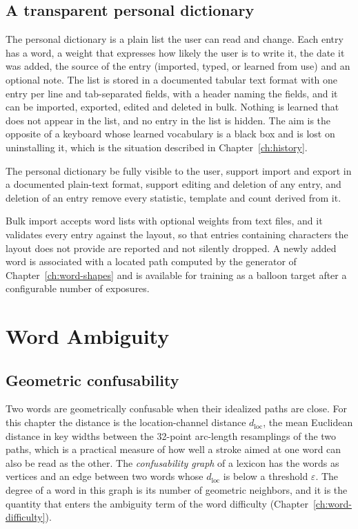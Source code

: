 \section{A transparent personal dictionary}

The personal dictionary is a plain list the user can read and change. Each entry has a word, a weight that expresses how likely the user is to write it, the date it was added, the source of the entry (imported, typed, or learned from use) and an optional note. The list is stored in a documented tabular text format with one entry per line and tab-separated fields, with a header naming the fields, and it can be imported, exported, edited and deleted in bulk. Nothing is learned that does not appear in the list, and no entry in the list is hidden. The aim is the opposite of a keyboard whose learned vocabulary is a black box and is lost on uninstalling it, which is the situation described in Chapter~\ref{ch:history}.

\begin{requirement}\label{req:dictionary}
The personal dictionary \must{} be fully visible to the user, \must{} support import and export in a documented plain-text format, \must{} support editing and deletion of any entry, and deletion of an entry \must{} remove every statistic, template and count derived from it.\evS
\end{requirement}

Bulk import accepts word lists with optional weights from text files, and it validates every entry against the layout, so that entries containing characters the layout does not provide are reported and not silently dropped. A newly added word is associated with a located path computed by the generator of Chapter~\ref{ch:word-shapes} and is available for training as a balloon target after a configurable number of exposures.

\chapter{Word Ambiguity}\label{ch:word-ambiguity}

\section{Geometric confusability}

Two words are geometrically confusable when their idealized paths are close. For this chapter the distance is the location-channel distance $d_{\mathrm{loc}}$, the mean Euclidean distance in key widths between the 32-point arc-length resamplings of the two paths, which is a practical measure of how well a stroke aimed at one word can also be read as the other. The \emph{confusability graph} of a lexicon has the words as vertices and an edge between two words whose $d_{\mathrm{loc}}$ is below a threshold $\varepsilon$. The degree of a word in this graph is its number of geometric neighbors, and it is the quantity that enters the ambiguity term of the word difficulty (Chapter~\ref{ch:word-difficulty}).


